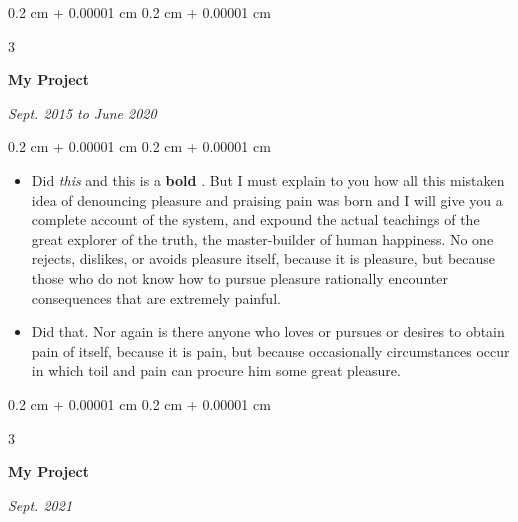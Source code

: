 \documentclass[10pt, letterpaper]{article}
\newenvironment{highlights}{
    \begin{itemize}[
        topsep=0.10 cm,
        parsep=0.10 cm,
        partopsep=0pt,
        itemsep=0pt,
        leftmargin=0.4 cm + 10pt + 0.6 cm
    ]
}{
    \end{itemize}
} %
\newenvironment{onecolentry}{
    \begin{adjustwidth}{
        0.2 cm + 0.00001 cm
    }{
        0.2 cm + 0.00001 cm
    }
}{
    \end{adjustwidth}
} %
\newenvironment{threecolentry}[3][]{
    \onecolentry
    \def\thirdColumn{#3}
    \setcolumnwidth{0.6 cm, \fill, 4.5 cm}
    \begin{paracol}{3}
    #2 \switchcolumn
}{
    \switchcolumn \raggedleft \thirdColumn
    \end{paracol}
    \endonecolentry
} %
\let\hrefWithoutArrow\href
\renewcommand{\href}[2]{\hrefWithoutArrow{#1}{\mbox{\ifthenelse{\equal{#2}{}}{ }{#2 }\raisebox{.15ex}{\footnotesize \faExternalLink*}}}}
\begin{document}
        \vspace{0.2 cm-3px}

        \begin{threecolentry}{
            \vspace*{\fill}
            \textbullet
            \vspace*{3px}
            \vspace*{\fill}
        }{
            
            
        \textit{Sept. 2015 to June 2020}}
            \textbf{My Project}
        \end{threecolentry}

        \vspace{0.10 cm-3px}
        \begin{onecolentry}
            \begin{highlights}
                \item Did \textit{this} and this is a \textbf{bold} \href{https://example.com}{link}. But I must explain to you how all this mistaken idea of denouncing pleasure and praising pain was born and I will give you a complete account of the system, and expound the actual teachings of the great explorer of the truth, the master-builder of human happiness. No one rejects, dislikes, or avoids pleasure itself, because it is pleasure, but because those who do not know how to pursue pleasure rationally encounter consequences that are extremely painful.
                \item Did that. Nor again is there anyone who loves or pursues or desires to obtain pain of itself, because it is pain, but because occasionally circumstances occur in which toil and pain can procure him some great pleasure.
            \end{highlights}
        \end{onecolentry}


        \vspace{0.2 cm-3px}

        \begin{threecolentry}{
            \vspace*{\fill}
            \textbullet
            \vspace*{3px}
            \vspace*{\fill}
        }{
            
            
        \textit{Sept. 2021}}
            \textbf{My Project}
        \end{threecolentry}
\end{document}
